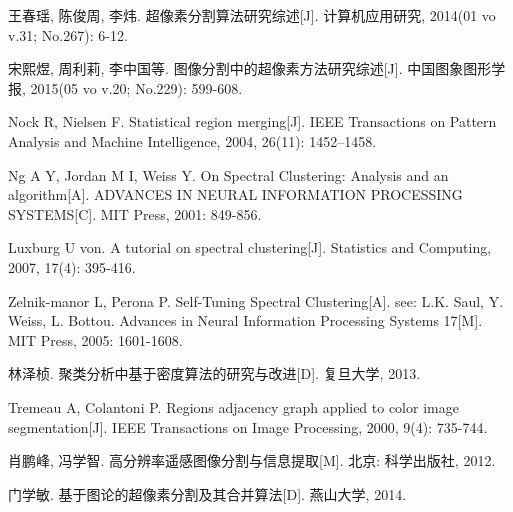 \small

\begin{thebibliography}{99}
    \setlength{\parskip}{0pt}  %

     王春瑶, 陈俊周, 李炜. 超像素分割算法研究综述[J]. 计算机应用研究, 2014(01 vo v.31; No.267): 6-12.

     宋熙煜, 周利莉, 李中国等. 图像分割中的超像素方法研究综述[J]. 中国图象图形学报, 2015(05 vo v.20; No.229): 599-608.

     Nock R, Nielsen F. Statistical region merging[J]. IEEE Transactions on Pattern Analysis and Machine Intelligence, 2004, 26(11): 1452–1458.

     Ng A Y, Jordan M I, Weiss Y. On Spectral Clustering: Analysis and an algorithm[A]. ADVANCES IN NEURAL INFORMATION PROCESSING SYSTEMS[C]. MIT Press, 2001: 849-856.

     Luxburg U von. A tutorial on spectral clustering[J]. Statistics and Computing, 2007, 17(4): 395-416.

     Zelnik-manor L, Perona P. Self-Tuning Spectral Clustering[A]. see: L.K. Saul, Y. Weiss, L. Bottou. Advances in Neural Information Processing Systems 17[M]. MIT Press, 2005: 1601-1608.

     林泽桢. 聚类分析中基于密度算法的研究与改进[D]. 复旦大学, 2013.

     Tremeau A, Colantoni P. Regions adjacency graph applied to color image segmentation[J]. IEEE Transactions on Image Processing, 2000, 9(4): 735-744.

     肖鹏峰, 冯学智. 高分辨率遥感图像分割与信息提取[M]. 北京: 科学出版社, 2012.

    门学敏. 基于图论的超像素分割及其合并算法[D]. 燕山大学, 2014.


\end{thebibliography}
